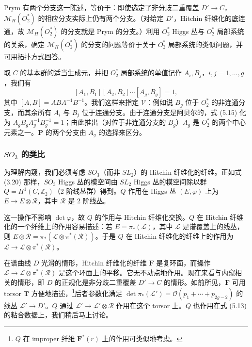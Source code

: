 Prym 有两个分支这一陈述，等价于：即使选定了非分歧二重覆盖 $D'\to C$，$\mathcal{M}_H(O_2^*)$ 的相应分支实际上仍有两个分支。（对给定 $D'$，Hitchin 纤维化的底连通，故 $\mathcal{M}_H(O_2^*)$ 的分支就是 Prym 的分支。）利用 $O_2^*$ Higgs 丛与 $O_2^*$ 局部系统的关系，确定 $\mathcal{M}_H(O_2^*)$ 的分支的问题等价于关于 $O_2^*$ 局部系统的类似问题，并可用拓扑方式回答。

取 $C$ 的基本群的适当生成元，并把 $O_2^*$ 局部系统的单值记作 $A_i,B_j$，$i,j=1,\dots,g$，我们有
\begin{equation}\tag{5.15}
[A_1,B_1][A_2,B_2]\cdots[A_g,B_g] = 1,
\end{equation}
其中 $[A,B] = ABA^{-1}B^{-1}$。我们这样来指定 $\mathcal{V}$：例如说 $B_g$ 位于 $O_2^*$ 的非连通分支，而其余所有 $A_i$ 与 $B_j$ 位于连通分支。由于连通分支是阿贝尔的，式 (5.15) 化为 $A_g B_g A_g^{-1}B_g^{-1} = 1$；由此推出（对位于非连通分支的 $B_g$）$A_g$ 是 $O_2^*$ 的两个中心元素之一。$\boldsymbol{P}$ 的两个分支由 $A_g$ 的选择来区分。


\subsubsection{\texorpdfstring{$SO_3$}{SO3} 的类比}

为理解内窥，我们必须考虑 $SO_3$（而非 $SL_2$）的 Hitchin 纤维化的纤维。正如式 (3.20) 那样，$SO_3$ Higgs 丛的模空间由 $SL_2$ Higgs 丛的模空间除以群 $Q = H^1(C,\mathbb{Z}_2)$（2 阶线丛群）得到。$Q$ 作用在 Higgs 丛 $(E,\varphi)$ 上为 $E\to E\otimes\mathcal{R}$，其中 $\mathcal{R}$ 是 2 阶线丛。

这一操作不影响 $\det\varphi$，故 $Q$ 的作用与 Hitchin 纤维化交换。$Q$ 在 Hitchin 纤维化的一个纤维上的作用容易描述：若 $E = \pi_*(\mathcal{L})$，其中 $\mathcal{L}$ 是谱覆盖上的线丛，则 $E\otimes\mathcal{R} = \pi_*(\mathcal{L}\otimes\pi^*(\mathcal{R}))$。于是 $Q$ 在 Hitchin 纤维化的纤维上的作用为 $\mathcal{L}\to\mathcal{L}\otimes\pi^*(\mathcal{R})$。

在谱曲线 $D$ 光滑的情形，Hitchin 纤维化的纤维 $\boldsymbol{F}$ 是复环面，而操作 $\mathcal{L}\to\mathcal{L}\otimes\pi^*(\mathcal{R})$ 是这个环面上的平移。它无不动点地作用。现在来看与内窥相关的情形，即 $D$ 的正规化是非分歧二重覆盖 $D'\to C$ 的情形。如前所见，$\boldsymbol{F}$ 可用 torsor $\boldsymbol{T}$ 方便地描述，\footnote{$Q$ 在 improper 纤维 $\boldsymbol{F}^*(r)$ 上的作用可类似地考虑。}后者参数化满足 $\det\pi_*(\mathcal{L}') = \mathcal{O}(p_1+\cdots+p_{2g-2})$ 的线丛 $\mathcal{L}'\to D'$。$Q$ 通过 $\mathcal{L}'\to\mathcal{L}'\otimes\mathcal{R}$ 作用在这个 torsor 上。$Q$ 也作用在式 (5.13) 的粘合数据上，我们稍后马上讨论。

